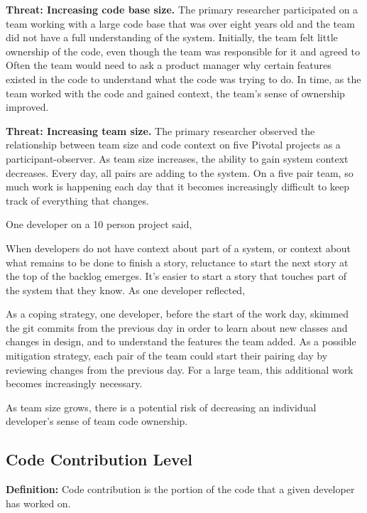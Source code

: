 \textbf{Threat: Increasing code base size.} The primary researcher participated on a team working with a large code base that was over eight years old and the team did not have a full understanding of the system. Initially, the team felt little ownership of the code, even though the team was responsible for it and agreed to  Often the team would need to ask a product manager why certain features existed in the code to understand what the code was trying to do. In time, as the team worked with the code and gained context, the team's sense of ownership improved.

\textbf{Threat: Increasing team size.} The primary researcher observed the relationship between team size and code context on five Pivotal projects as a participant-observer. As team size increases, the ability to gain system context decreases. Every day, all pairs are adding to the system. On a five pair team, so much work is happening each day that it becomes increasingly difficult to keep track of everything that changes.

One developer on a 10 person project said, 

When developers do not have context about part of a system, or context about what remains to be done to finish a story, reluctance to start the next story at the top of the backlog emerges. It's easier to start a story that touches part of the system that they know. As one developer reflected, 

As a coping strategy, one developer, before the start of the work day, skimmed the git commits from the previous day in order to learn about new classes and changes in design, and to understand the features the team added. As a possible mitigation strategy, each pair of the team could start their pairing day by reviewing changes from the previous day. For a large team, this additional work becomes increasingly necessary. 

As team size grows, there is a potential risk of decreasing an individual developer's sense of team code ownership. 

\subsection{Code Contribution Level}
\textbf{Definition:} Code contribution is the portion of the code that a given developer has worked on. 

